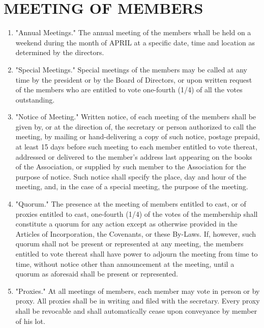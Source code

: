 \documentclass[12pt, letterpaper]{article}
\begin{document}
\section{MEETING OF MEMBERS}
\begin{enumerate}
 \item "Annual Meetings."
  The annual meeting of the members whall be held on a weekend during the month of APRIL at a specific date, time and location as determined by the directors.
 \item "Special Meetings."
  Special meetings of the members may be called at any time by the president or by the Board of Directors, or upon written request of the members who are entitled to vote one-fourth (1/4) of all the votes outstanding.
 \item "Notice of Meeting."
  Written notice, of each meeting of the members shall be given by, or at the direction of, the secretary or person authorized to call the meeting, by mailing or hand-delivering a copy of such notice, postage prepaid, at least 15 days before such meeting to each member entitled to vote thereat, addressed or delivered to the member's address last appearing on the books of the Association, or supplied by such member to the Association for the purpose of notice.
  Such notice shall specify the place, day and hour of the meeting, and, in the case of a special meeting, the purpose of the meeting.
 \item "Quorum."
  The presence at the meeting of members entitled to cast, or of proxies entitled to cast, one-fourth (1/4) of the votes of the membership shall constitute a quorum for any action except as otherwise provided in the Articles of Incorporation, the Covenants, or these By-Laws.
  If, however, such quorum shall not be present or represented at any meeting, the members entitled to vote thereat shall have power to adjourn the meeting from time to time, without notice other than announcement at the meeting, until a quorum as aforesaid shall be present or represented.
 \item "Proxies."
  At all meetings of members, each member may vote in person or by proxy.
  All proxies shall be in writing and filed with the secretary.
  Every proxy shall be revocable and shall automatically cease upon conveyance by member of his lot.
\end{enumerate}
\end{document}
